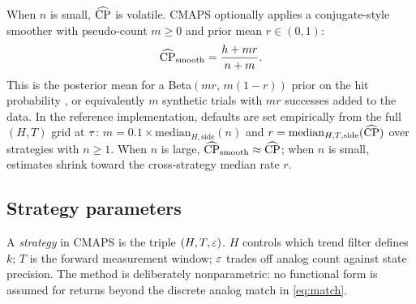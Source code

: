 When $n$ is small, $\widehat{\mathrm{CP}}$ is volatile.
CMAPS optionally applies a conjugate-style smoother with pseudo-count $m \ge 0$ and prior mean $r \in (0,1)$:
\begin{equation}
  \widehat{\mathrm{CP}}_{\mathrm{smooth}}
  = \frac{h + m r}{n + m}.
  \label{eq:smooth}
\end{equation}
This is the posterior mean for a Beta$(m r,\, m(1-r))$ prior on the hit probability \cite{gelman2013bayesian}, or equivalently $m$ synthetic trials with $mr$ successes added to the data.
In the reference implementation, defaults are set empirically from the full $(H,T)$ grid at $\tau$:
$m = 0.1 \times \mathrm{median}_{H,\mathrm{side}}(n)$ and
$r = \mathrm{median}_{H,T,\mathrm{side}}(\widehat{\mathrm{CP}})$ over strategies with $n \ge 1$.
When $n$ is large, $\widehat{\mathrm{CP}}_{\mathrm{smooth}} \approx \widehat{\mathrm{CP}}$; when $n$ is small, estimates shrink toward the cross-strategy median rate $r$.

\subsection{Strategy parameters}

A \emph{strategy} in CMAPS is the triple $(H,T,\varepsilon)$.
$H$ controls which trend filter defines $k$; $T$ is the forward measurement window; $\varepsilon$ trades off analog count against state precision.
The method is deliberately nonparametric: no functional form is assumed for returns beyond the discrete analog match in \eqref{eq:match}.
